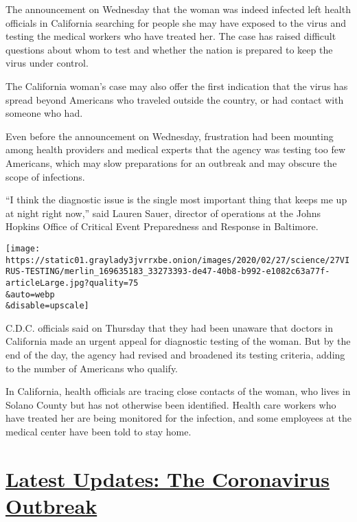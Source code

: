 The announcement on Wednesday that the woman was indeed infected left
health officials in California searching for people she may have exposed
to the virus and testing the medical workers who have treated her. The
case has raised difficult questions about whom to test and whether the
nation is prepared to keep the virus under control.

The California woman's case may also offer the first indication that the
virus has spread beyond Americans who traveled outside the country, or
had contact with someone who had.

Even before the announcement on Wednesday, frustration had been mounting
among health providers and medical experts that the agency was testing
too few Americans, which may slow preparations for an outbreak and may
obscure the scope of infections.

``I think the diagnostic issue is the single most important thing that
keeps me up at night right now,'' said Lauren Sauer, director of
operations at the Johns Hopkins Office of Critical Event Preparedness
and Response in Baltimore.

\texttt{[image: https://static01.graylady3jvrrxbe.onion/images/2020/02/27/science/27VIRUS-TESTING/merlin\_169635183\_33273393-de47-40b8-b992-e1082c63a77f-articleLarge.jpg?quality=75\\\&auto=webp\\\&disable=upscale]}

C.D.C. officials said on Thursday that they had been unaware that
doctors in California made an urgent appeal for diagnostic testing of
the woman. But by the end of the day, the agency had revised and
broadened its testing criteria, adding to the number of Americans who
qualify.

In California, health officials are tracing close contacts of the woman,
who lives in Solano County but has not otherwise been identified. Health
care workers who have treated her are being monitored for the infection,
and some employees at the medical center have been told to stay home.

\hypertarget{latest-updates-the-coronavirus-outbreak}{%
\section{\texorpdfstring{\href{https://www.nytimes3xbfgragh.onion/2020/08/21/world/covid-19-coronavirus.html?action=click\&pgtype=Article\&state=default\&region=MAIN_CONTENT_1\&context=storylines_live_updates}{Latest
Updates: The Coronavirus
Outbreak}}{Latest Updates: The Coronavirus Outbreak}}\label{latest-updates-the-coronavirus-outbreak}}

